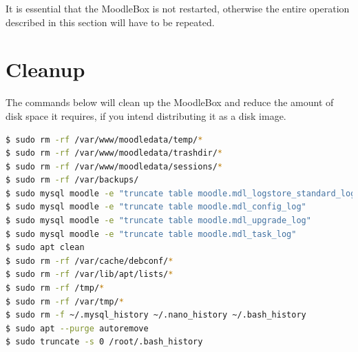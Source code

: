 \documentclass[12pt]{article}
\begin{document}
It is essential that the MoodleBox is not restarted, otherwise the entire operation described in this section will have to be repeated.

\section{Cleanup}

The commands below will clean up the MoodleBox and reduce the amount of disk space it requires, if you intend distributing it as a disk image.

\begin{lstlisting}[language=bash]
$ sudo rm -rf /var/www/moodledata/temp/*
$ sudo rm -rf /var/www/moodledata/trashdir/*
$ sudo rm -rf /var/www/moodledata/sessions/*
$ sudo rm -rf /var/backups/
$ sudo mysql moodle -e "truncate table moodle.mdl_logstore_standard_log"
$ sudo mysql moodle -e "truncate table moodle.mdl_config_log"
$ sudo mysql moodle -e "truncate table moodle.mdl_upgrade_log"
$ sudo mysql moodle -e "truncate table moodle.mdl_task_log"
$ sudo apt clean
$ sudo rm -rf /var/cache/debconf/*
$ sudo rm -rf /var/lib/apt/lists/*
$ sudo rm -rf /tmp/*
$ sudo rm -rf /var/tmp/*
$ sudo rm -f ~/.mysql_history ~/.nano_history ~/.bash_history
$ sudo apt --purge autoremove
$ sudo truncate -s 0 /root/.bash_history
\end{lstlisting}
\end{document}
